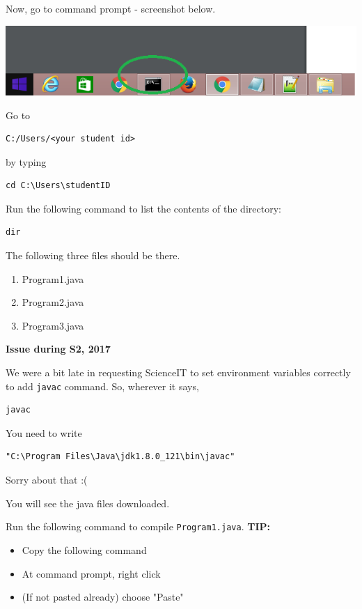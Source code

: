 \begin{questions}
Now, go to command prompt - screenshot below.

\includegraphics{forStudents/commandPrompt}

Go to 

\begin{verbatim}
C:/Users/<your student id>
\end{verbatim}

by typing

\begin{verbatim}
cd C:\Users\studentID	
\end{verbatim}

Run the following command to list the contents of the directory:

\begin{lstlisting}[numbers=none]
dir
\end{lstlisting}

The following three files should be there.

\begin{enumerate}
\item Program1.java
\item Program2.java
\item Program3.java
\end{enumerate}

\textbf{Issue during S2, 2017}

We were a bit late in requesting ScienceIT to set environment variables correctly to add \texttt{javac} command. So, wherever it says,

\begin{verbatim}
javac	
\end{verbatim}

You need to write
\begin{verbatim}
"C:\Program Files\Java\jdk1.8.0_121\bin\javac"
\end{verbatim}

Sorry about that :(

You will see the java files downloaded.

Run the following command to compile \texttt{Program1.java}. \textbf{TIP: } 
\newline
\color{blue}
\begin{itemize}
\item Copy the following command 
\item At command prompt, right click
\item (If not pasted already) choose "Paste"
\end{itemize}
\color{black}


\end{questions}

